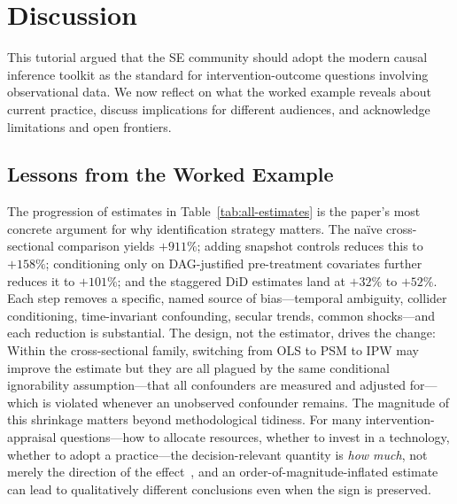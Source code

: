 \section{Discussion}
\label{sec:discussion}


This tutorial argued that the SE community should adopt the modern causal inference toolkit as the standard for intervention-outcome questions involving observational data.
We now reflect on what the worked example reveals about current practice, discuss implications for different audiences, and acknowledge limitations and open frontiers.

\subsection{Lessons from the Worked Example}

The progression of estimates in Table~\ref{tab:all-estimates} is the paper's most concrete argument for why identification strategy matters.
The na\"ive cross-sectional comparison yields $+911\%$; adding snapshot controls reduces this to $+158\%$; conditioning only on DAG-justified pre-treatment covariates further reduces it to $+101\%$; and the staggered DiD estimates land at $+32\%$ to $+52\%$.
Each step removes a specific, named source of bias---temporal ambiguity, collider conditioning, time-invariant confounding, secular trends, common shocks---and each reduction is substantial.
The design, not the estimator, drives the change: Within the cross-sectional family, switching from OLS to PSM to IPW may improve the estimate but they are all plagued by the same conditional ignorability assumption---that all confounders are measured and adjusted for---which is violated whenever an unobserved confounder remains.
The magnitude of this shrinkage matters beyond methodological tidiness.
For many intervention-appraisal questions---how to allocate resources, whether to invest in a technology, whether to adopt a practice---the decision-relevant quantity is \emph{how much}, not merely the direction of the effect~\cite{lundberg2021estimand}, and an order-of-magnitude-inflated estimate can lead to qualitatively different conclusions even when the sign is preserved.


